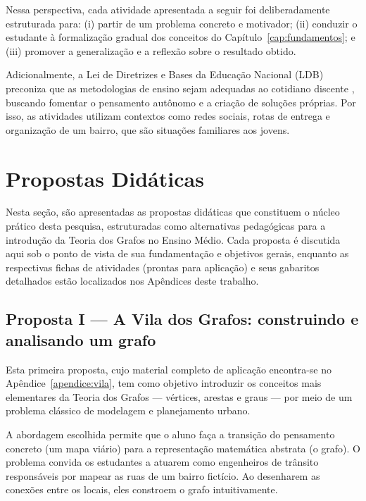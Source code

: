 \documentclass[
  12pt,
  oneside,
  a4paper,
  english,
  brazilian
  ]{abntex2}
\theoremstyle{definition}
\begin{document}
Nessa perspectiva, cada atividade apresentada a seguir foi deliberadamente estruturada para: (i) partir de um problema concreto e motivador; (ii) conduzir o estudante à formalização gradual dos conceitos do Capítulo~\ref{cap:fundamentos}; e (iii) promover a generalização e a reflexão sobre o resultado obtido.

Adicionalmente, a Lei de Diretrizes e Bases da Educação Nacional (LDB) preconiza que as metodologias de ensino sejam adequadas ao cotidiano discente \cite{brasil1996}, buscando fomentar o pensamento autônomo e a criação de soluções próprias. Por isso, as atividades utilizam contextos como redes sociais, rotas de entrega e organização de um bairro, que são situações familiares aos jovens.

\section{Propostas Didáticas}
\label{sec:propostas_didaticas}

Nesta seção, são apresentadas as propostas didáticas que constituem o núcleo prático desta pesquisa, estruturadas como alternativas pedagógicas para a introdução da Teoria dos Grafos no Ensino Médio. Cada proposta é discutida aqui sob o ponto de vista de sua fundamentação e objetivos gerais, enquanto as respectivas fichas de atividades (prontas para aplicação) e seus gabaritos detalhados estão localizados nos Apêndices deste trabalho.

\subsection{Proposta I --- A Vila dos Grafos: construindo e analisando um grafo}
\label{sub:proposta_vila}

Esta primeira proposta, cujo material completo de aplicação encontra-se no Apêndice~\ref{apendice:vila}, tem como objetivo introduzir os conceitos mais elementares da Teoria dos Grafos --- vértices, arestas e graus --- por meio de um problema clássico de modelagem e planejamento urbano.

A abordagem escolhida permite que o aluno faça a transição do pensamento concreto (um mapa viário) para a representação matemática abstrata (o grafo). O problema convida os estudantes a atuarem como engenheiros de trânsito responsáveis por mapear as ruas de um bairro fictício. Ao desenharem as conexões entre os locais, eles constroem o grafo intuitivamente.
\end{document}
